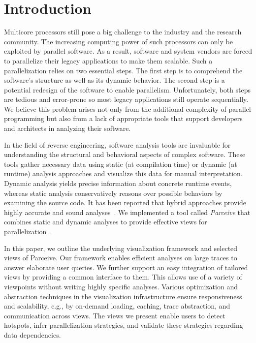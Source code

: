 \section{Introduction}
\label{sec:introduction}
Multicore processors still pose a big challenge to the industry and the
research community. The increasing computing power of such processors can only
be exploited by parallel software. As a result, software and system vendors
are forced to parallelize their legacy applications to make them scalable. Such
a parallelization relies on two essential steps. The first step is to
comprehend the software's structure as well as its dynamic behavior. The second
step is a potential redesign of the software to enable parallelism.
Unfortunately, both steps are tedious and error-prone so most legacy
applications still operate sequentially. We believe this problem arises not
only from the additional complexity of parallel programming but also from a
lack of appropriate tools that support developers and architects in analyzing
their software.

In the field of reverse engineering, software analysis tools are invaluable for
understanding the structural and behavioral aspects of complex software. These
tools gather necessary data using static (at compilation time) or dynamic (at
runtime) analysis approaches and visualize this data for manual interpretation.
Dynamic analysis yields precise information about concrete runtime events,
whereas static analysis conservatively reasons over possible behaviors by
examining the source code. It has been reported that hybrid approaches provide
highly accurate and sound analyses~\cite{StaticDynamic}. We implemented a tool
called \emph{Parceive} that combines static and dynamic analyses to provide
effective views for parallelization~\cite{Parceive}.

In this paper, we outline the underlying visualization framework and selected
views of Parceive. Our framework enables efficient analyses on large traces to
answer elaborate user queries. We further support an easy integration of
tailored views by providing a common interface to them. This allows use of a
variety of viewpoints without writing highly specific analyses. Various
optimization and abstraction techniques in the visualization infrastructure
ensure responsiveness and scalability, e.g., by on-demand loading, caching,
trace abstraction, and communication across views. The views we present enable
users to detect hotspots, infer parallelization strategies, and validate these
strategies regarding data dependencies.
